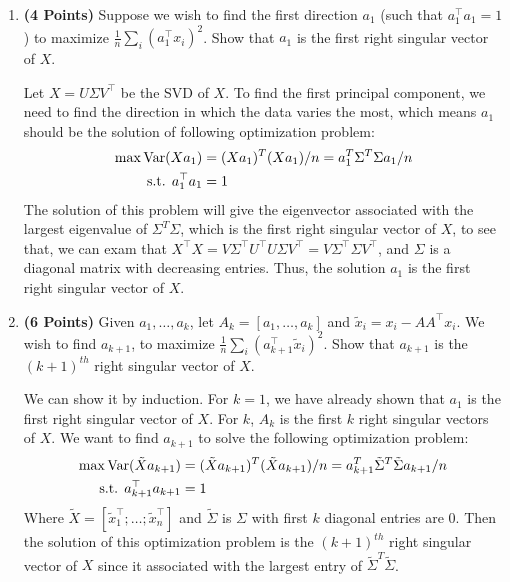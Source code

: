 \begin{enumerate}

\item  \textbf{(4 Points)}
Suppose we wish to find the first direction $a_1$ (such that $a_1^\top a_1 = 1$) to maximize $\frac{1}{n} \sum_i (a_1^\top x_i)^2$.
Show that $a_1$ is the first right singular vector of $X$.

\begin{soln}
Let $X = U\Sigma V^\top$ be the SVD of $X$. To find the first principal component, we need to find the direction in which the data varies the most, which means $a_1$ should be the solution of following optimization problem:
\begin{align*}
  \max \mathrm{Var} (Xa_1) &= (Xa_1)^T(Xa_1)/n = a_1^T \Sigma^T \Sigma a_1/n \\
  \text{s.t. } a_1^\top a_1 &= 1
\end{align*}
The solution of this problem will give the eigenvector associated with the largest eigenvalue of $\Sigma^T \Sigma$, which is the first right singular vector of $X$, to see that, we can exam that $X^\top X = V\Sigma^\top U^\top U\Sigma V^\top = V\Sigma^\top \Sigma V^\top$, and $\Sigma$ is a diagonal matrix with decreasing entries. Thus, the solution $a_1$ is the first right singular vector of $X$.
\end{soln}

\item  \textbf{(6 Points)}
Given $a_1, \dots, a_k$, let $A_k = [a_1, \dots, a_k]$ and 
$\tilde{x}_i = x_i - A A^\top x_i$. We wish to find $a_{k+1}$, to maximize
$\frac{1}{n} \sum_i (a_{k+1}^\top \tilde{x}_i)^2$. Show that $a_{k+1}$ is the
$(k+1)^{th}$ right singular vector of $X$.

\begin{soln}
  We can show it by induction. For $k=1$, we have already shown that $a_1$ is the first right singular vector of $X$. For $k$, $A_k$ is the first $k$ right singular vectors of $X$. We want to find $a_{k+1}$ to solve the following optimization problem:
  \begin{align*}
    \max \mathrm{Var} (\tilde{X}a_{k+1}) &= (\tilde{X}a_{k+1})^T(\tilde{X}a_{k+1})/n = a_{k+1}^T \tilde{\Sigma}^T \tilde{\Sigma} a_{k+1}/n \\
    \text{s.t. } a_{k+1}^\top a_{k+1} &= 1
  \end{align*}
  Where $\tilde{X} = [\tilde{x}_1^\top; \dots; \tilde{x}_n^\top]$ and $\tilde{\Sigma}$ is $\Sigma$ with first $k$ diagonal entries are 0. Then the solution of this optimization problem is the $(k+1)^{th}$ right singular vector of $X$ since it associated with the largest entry of $\tilde{\Sigma}^T \tilde{\Sigma}$.
\end{soln}

\end{enumerate}


